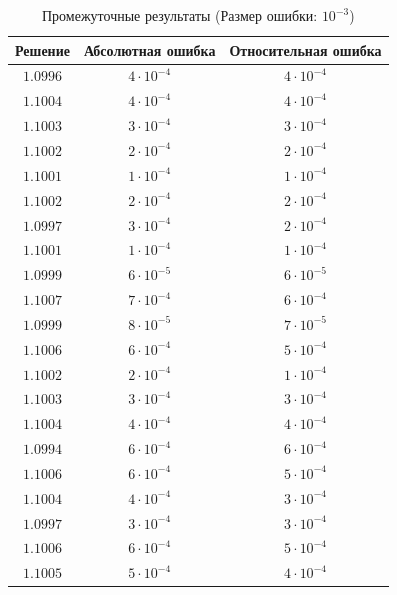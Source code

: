 \begin{table}[h]
   \centering
   \caption{Промежуточные результаты (Размер ошибки: $10^{-3}$)}
   \begin{tabular}{|c|c|c|}
       \hline
       Решение & Абсолютная ошибка & Относительная ошибка \\
       \hline
       $1.0996$ & $4 \cdot 10^{-4}$ & $4 \cdot 10^{-4}$ \\
       \hline
       $1.1004$ & $4 \cdot 10^{-4}$ & $4 \cdot 10^{-4}$ \\
       \hline
       $1.1003$ & $3 \cdot 10^{-4}$ & $3 \cdot 10^{-4}$ \\
       \hline
       $1.1002$ & $2 \cdot 10^{-4}$ & $2 \cdot 10^{-4}$ \\
       \hline
       $1.1001$ & $1 \cdot 10^{-4}$ & $1 \cdot 10^{-4}$ \\
       \hline
       $1.1002$ & $2 \cdot 10^{-4}$ & $2 \cdot 10^{-4}$ \\
       \hline
       $1.0997$ & $3 \cdot 10^{-4}$ & $2 \cdot 10^{-4}$ \\
       \hline
       $1.1001$ & $1 \cdot 10^{-4}$ & $1 \cdot 10^{-4}$ \\
       \hline
       $1.0999$ & $6 \cdot 10^{-5}$ & $6 \cdot 10^{-5}$ \\
       \hline
       $1.1007$ & $7 \cdot 10^{-4}$ & $6 \cdot 10^{-4}$ \\
       \hline
       $1.0999$ & $8 \cdot 10^{-5}$ & $7 \cdot 10^{-5}$ \\
       \hline
       $1.1006$ & $6 \cdot 10^{-4}$ & $5 \cdot 10^{-4}$ \\
       \hline
       $1.1002$ & $2 \cdot 10^{-4}$ & $1 \cdot 10^{-4}$ \\
       \hline
       $1.1003$ & $3 \cdot 10^{-4}$ & $3 \cdot 10^{-4}$ \\
       \hline
       $1.1004$ & $4 \cdot 10^{-4}$ & $4 \cdot 10^{-4}$ \\
       \hline
       $1.0994$ & $6 \cdot 10^{-4}$ & $6 \cdot 10^{-4}$ \\
       \hline
       $1.1006$ & $6 \cdot 10^{-4}$ & $5 \cdot 10^{-4}$ \\
       \hline
       $1.1004$ & $4 \cdot 10^{-4}$ & $3 \cdot 10^{-4}$ \\
       \hline
       $1.0997$ & $3 \cdot 10^{-4}$ & $3 \cdot 10^{-4}$ \\
       \hline
       $1.1006$ & $6 \cdot 10^{-4}$ & $5 \cdot 10^{-4}$ \\
       \hline
       $1.1005$ & $5 \cdot 10^{-4}$ & $4 \cdot 10^{-4}$ \\

\end{tabular}
\end{table}
